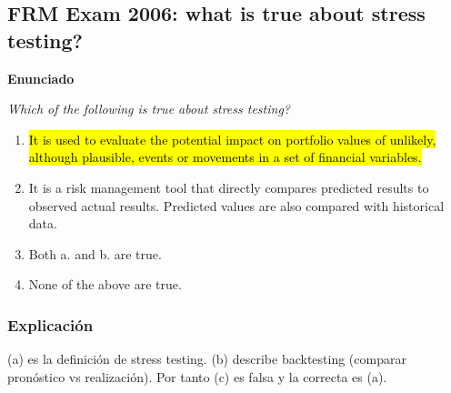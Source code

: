 ﻿\subsection{FRM Exam 2006: what is true about stress testing?}

\textbf{Enunciado}

\emph{Which of the following is true about stress testing?}
\begin{enumerate}[label=\alph*.]
\item \hl{It is used to evaluate the potential impact on portfolio values of unlikely, although plausible, events or movements in a set of financial variables.}
\item It is a risk management tool that directly compares predicted results to observed actual results. Predicted values are also compared with historical data.
\item Both a. and b. are true.
\item None of the above are true.
\end{enumerate}

\subsubsection*{Explicación}

(a) es la definición de stress testing. (b) describe backtesting (comparar pronóstico vs realización). Por tanto (c) es falsa y la correcta es (a).











